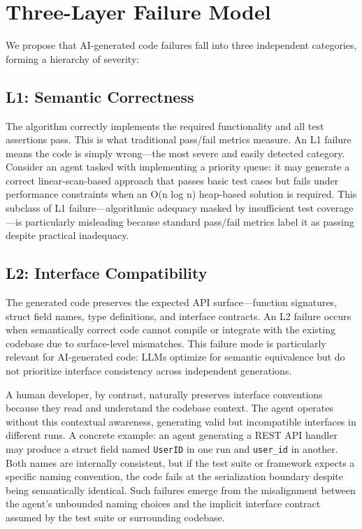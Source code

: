 \documentclass[conference]{IEEEtran}
\begin{document}
\section{Three-Layer Failure Model}

We propose that AI-generated code failures fall into three independent categories, forming a hierarchy of severity:

\subsection{L1: Semantic Correctness}

The algorithm correctly implements the required functionality and all test assertions pass.
This is what traditional pass/fail metrics measure.
An L1 failure means the code is simply wrong---the most severe and easily detected category.
Consider an agent tasked with implementing a priority queue: it may generate a correct linear-scan-based approach that passes basic test cases but fails under performance constraints when an O(n log n) heap-based solution is required.
This subclass of L1 failure---algorithmic adequacy masked by insufficient test coverage---is particularly misleading because standard pass/fail metrics label it as passing despite practical inadequacy.

\subsection{L2: Interface Compatibility}

The generated code preserves the expected API surface---function signatures, struct field names, type definitions, and interface contracts.
An L2 failure occurs when semantically correct code cannot compile or integrate with the existing codebase due to surface-level mismatches.
This failure mode is particularly relevant for AI-generated code: LLMs optimize for semantic equivalence but do not prioritize interface consistency across independent generations.

A human developer, by contrast, naturally preserves interface conventions because they read and understand the codebase context. The agent operates without this contextual awareness, generating valid but incompatible interfaces in different runs.
A concrete example: an agent generating a REST API handler may produce a struct field named \texttt{UserID} in one run and \texttt{user\_id} in another. Both names are internally consistent, but if the test suite or framework expects a specific naming convention, the code fails at the serialization boundary despite being semantically identical. Such failures emerge from the misalignment between the agent's unbounded naming choices and the implicit interface contract assumed by the test suite or surrounding codebase.
\end{document}
